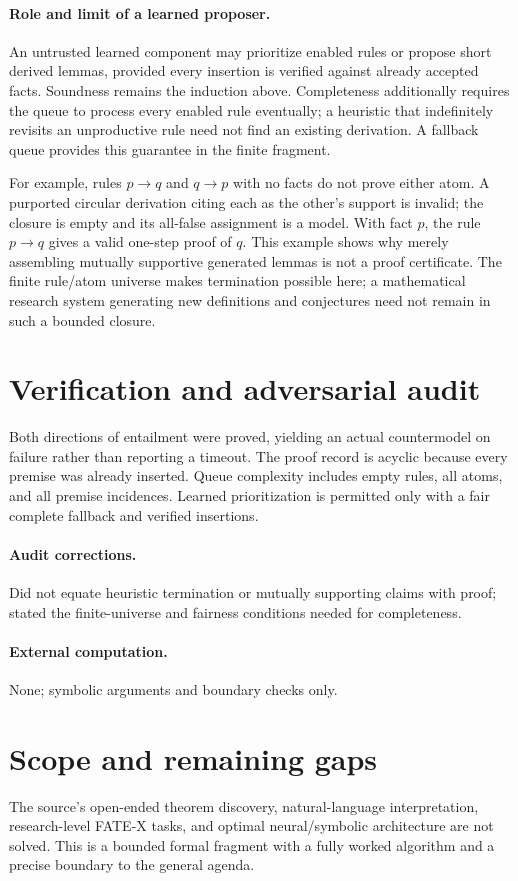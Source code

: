 \documentclass[11pt]{article}
\begin{document}
\paragraph{Role and limit of a learned proposer.}
An untrusted learned component may prioritize enabled rules or propose short derived lemmas, provided every insertion is verified against already accepted facts. Soundness remains the induction above. Completeness additionally requires the queue to process every enabled rule eventually; a heuristic that indefinitely revisits an unproductive rule need not find an existing derivation. A fallback queue provides this guarantee in the finite fragment.

For example, rules $p\to q$ and $q\to p$ with no facts do not prove either atom. A purported circular derivation citing each as the other's support is invalid; the closure is empty and its all-false assignment is a model. With fact $p$, the rule $p\to q$ gives a valid one-step proof of $q$. This example shows why merely assembling mutually supportive generated lemmas is not a proof certificate. The finite rule/atom universe makes termination possible here; a mathematical research system generating new definitions and conjectures need not remain in such a bounded closure.
\section{Verification and adversarial audit}
Both directions of entailment were proved, yielding an actual countermodel on failure rather than reporting a timeout. The proof record is acyclic because every premise was already inserted. Queue complexity includes empty rules, all atoms, and all premise incidences. Learned prioritization is permitted only with a fair complete fallback and verified insertions.
\paragraph{Audit corrections.} Did not equate heuristic termination or mutually supporting claims with proof; stated the finite-universe and fairness conditions needed for completeness.
\paragraph{External computation.} None; symbolic arguments and boundary checks only.
\section{Scope and remaining gaps}
The source's open-ended theorem discovery, natural-language interpretation, research-level FATE-X tasks, and optimal neural/symbolic architecture are not solved. This is a bounded formal fragment with a fully worked algorithm and a precise boundary to the general agenda.
\end{document}
